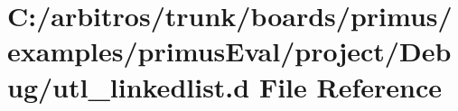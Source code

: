 \hypertarget{boards_2primus_2examples_2primus_eval_2project_2_debug_2utl__linkedlist_8d}{\section{C\-:/arbitros/trunk/boards/primus/examples/primus\-Eval/project/\-Debug/utl\-\_\-linkedlist.d File Reference}
\label{boards_2primus_2examples_2primus_eval_2project_2_debug_2utl__linkedlist_8d}
}
